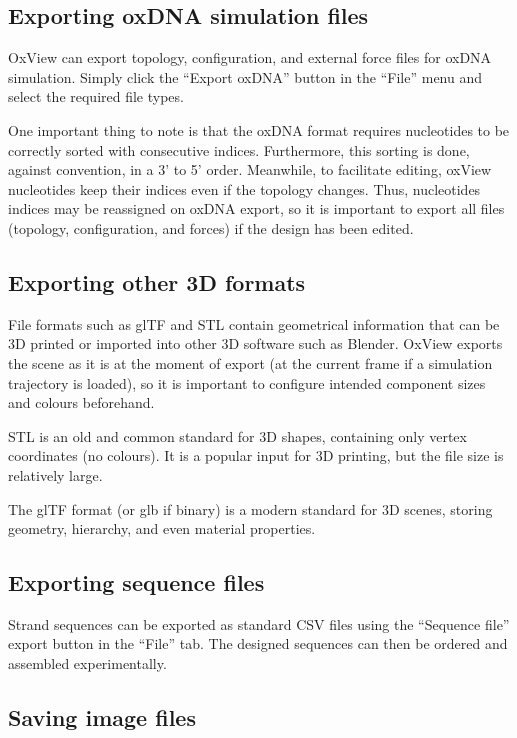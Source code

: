 \subsection{Exporting oxDNA simulation files}
OxView can export topology, configuration, and external force files for oxDNA simulation. Simply click the ``Export oxDNA'' button in the ``File'' menu and select the required file types.

One important thing to note is that the oxDNA format requires nucleotides to be correctly sorted with consecutive indices. Furthermore, this sorting is done, against convention, in a 3' to 5' order. Meanwhile, to facilitate editing, oxView nucleotides keep their indices even if the topology changes. Thus, nucleotides indices may be reassigned on oxDNA export, so it is important to export all files (topology, configuration, and forces) if the design has been edited.

\subsection{Exporting other 3D formats}
File formats such as glTF and STL contain geometrical information that can be 3D printed or imported into other 3D software such as Blender. OxView exports the scene as it is at the moment of export (at the current frame if a simulation trajectory is loaded), so it is important to configure intended component sizes and colours beforehand.

STL is an old and common standard for 3D shapes, containing only vertex coordinates (no colours). It is a popular input for 3D printing, but the file size is relatively large.

The glTF format (or glb if binary) is a modern standard for 3D scenes, storing geometry, hierarchy, and even material properties.

\subsection{Exporting sequence files}
Strand sequences can be exported as standard CSV files using the ``Sequence file'' export button in the ``File'' tab. The designed sequences can then be ordered and assembled experimentally.

\subsection{Saving image files}\label{sec:image_export}

